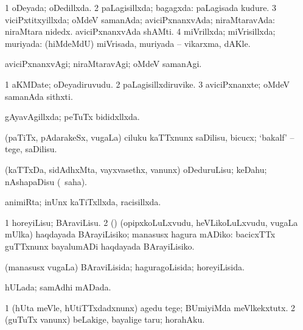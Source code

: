 {\bentry
{} 
\gl{\gu}
\expl{}
\bmng
\bnum
\num{1} oDeyada; oDedillxda. 
\num{2} paLagisillxda; bagagxda:  paLagisada kudure. 
\num{3} viciPxtitxyillxda; oMdeV samanAda; aviciPxnanxvAda; niraMtaravAda:  niraMtara nidedx.  aviciPxnanxvAda shAMti. 
\num{4} miVrillxda; miVrisillxda; muriyada:  (hiMdeMdU) miVrisada, muriyada -- vikarxma, dAKle. 
\enum
\emng
\eentry

\bentry
{} 
\gl{\kirxvi}
\expl{}
\bmng
aviciPxnanxvAgi; niraMtaravAgi; oMdeV samanAgi. 
\emng
\eentry

\bentry
{} 
\gl{\nA}
\expl{}
\bmng
\bnum
\num{1} aKMDate; oDeyadiruvudu. 
\num{2} paLagisillxdiruvike. 
\num{3} aviciPxnanxte; oMdeV samanAda sithxti. 
\enum
\emng
\eentry

\bentry
{} 
\gl{\gu}
\expl{}
\bmng
gAyavAgillxda; peTuTx bididxllxda. 
\emng
\eentry

\bentry
{} 
\gl{\sakirx}
\expl{}
\bmng
(paTiTx, pAdarakeSx, \mo vugaLa) ciluku kaTTxnunx saDilisu, bicucx; `bakalf' -- tege, saDilisu. 
\emng
\eentry

\bentry
{} 
\gl{\sakirx}
\bmng
(kaTTxDa, sidAdhxMta, vayxvasethx, \mo vanunx) oDeduruLisu; keDahu; nAshapaDisu (\rUpa\ saha). 
\emng
\eentry

\bentry
{} 
\gl{\gu}
\bmng
animiRta; inUnx kaTiTxllxda, racisillxda. 
\emng
\eentry

\bentry
{} 
\gl{\sakirx}
\expl{}
\bmng
\bnum
\num{1} horeyiLisu; BAraviLisu. 
\num{2} (\AtAmx) (opipxkoLuLxvudu, heVLikoLuLxvudu, \mo vugaLa mUlka) haqdayada BArayiLisiko; manasusx hagura mADiko:  bacicxTTx guTTxnunx bayalumADi haqdayada BArayiLisiko. 
\enum
\emng
\eentry

\bentry
{} 
\gl{\gu}
\expl{}
\bmng
(manasusx \mo vugaLa) BAraviLisida; haguragoLisida; horeyiLisida. 
\emng
\eentry

\bentry
{} 
\gl{\gu}
\expl{}
\bmng
hULada; samAdhi mADada. 
\emng
\eentry

\bentry
{} 
\gl{\sakirx}
\bmng
\bnum
\num{1} (hUta meVle, hUtiTTxdadxnunx) agedu tege; BUmiyiMda meVlkekxtutx. 
\num{2} (guTuTx \mo vanunx) beLakige, bayalige taru; horahAku. 
\enum
\emng
\eentry

}

